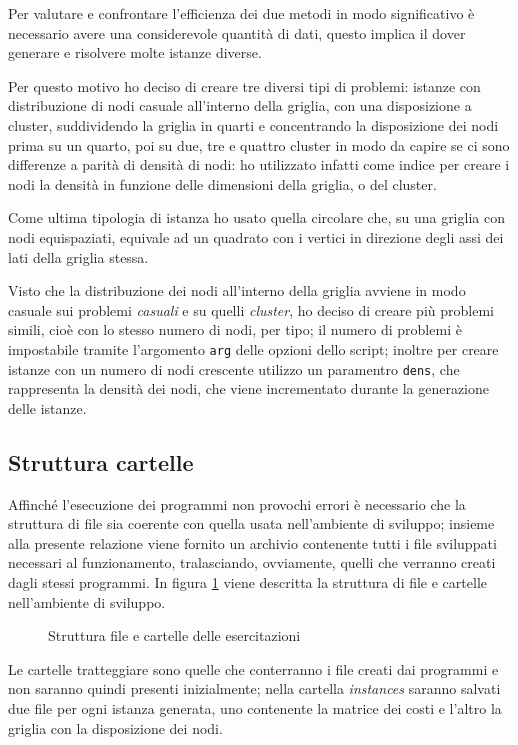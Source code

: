 Per valutare e confrontare l'efficienza dei due metodi in modo significativo è necessario avere una considerevole quantità di dati, questo implica il dover generare e risolvere molte istanze diverse.

Per questo motivo ho deciso di creare tre diversi tipi di problemi: istanze con distribuzione di nodi casuale all'interno della griglia, con una disposizione a cluster, suddividendo la griglia in quarti e concentrando la disposizione dei nodi prima su un quarto, poi su due, tre e quattro cluster in modo da capire se ci sono differenze a parità di densità di nodi: ho utilizzato infatti come indice per creare i nodi la densità in funzione delle dimensioni della griglia, o del cluster.

Come ultima tipologia di istanza ho usato quella circolare che, su una griglia con nodi equispaziati, equivale ad un quadrato con i vertici in direzione degli assi dei lati della griglia stessa.

Visto che la distribuzione dei nodi all'interno della griglia avviene in modo casuale sui problemi \emph{casuali} e su quelli \emph{cluster}, ho deciso di creare più problemi simili, cioè con lo stesso numero di nodi, per tipo; il numero di problemi è impostabile tramite l'argomento \texttt{arg} delle opzioni dello script; inoltre per creare istanze con un numero di nodi crescente utilizzo un paramentro \texttt{dens}, che rappresenta la densità dei nodi, che viene incrementato durante la generazione delle istanze.

\subsection{Struttura cartelle}
Affinché l'esecuzione dei programmi non provochi errori è necessario che la struttura di file sia coerente con quella usata nell'ambiente di sviluppo; insieme alla presente relazione viene fornito un archivio contenente tutti i file sviluppati necessari al funzionamento, tralasciando, ovviamente, quelli che verranno creati dagli stessi programmi.
In figura \ref{fig:struttura} viene descritta la struttura di file e cartelle nell'ambiente di sviluppo.

\begin{figure}[htb]
\centering

\caption{Struttura file e cartelle delle esercitazioni}
\label{fig:struttura}
\end{figure}

Le cartelle tratteggiare sono quelle che conterranno i file creati dai programmi e non saranno quindi presenti inizialmente; nella cartella \emph{instances} saranno salvati due file per ogni istanza generata, uno contenente la matrice dei costi e l'altro la griglia con la disposizione dei nodi.

